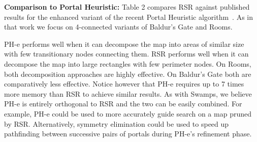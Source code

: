 \textbf{Comparison to Portal Heuristic:}
Table 2 compares RSR against published results for the enhanced variant of the
recent Portal Heuristic algorithm~\cite{goldenberg10}.  As in that work we focus
on 4-connected variants of Baldur's Gate and Rooms.
\par
PH-e performs well when it can decompose the map into areas of similar size with
few transitionary nodes connecting them.
RSR performs well when it can decompose the map into large rectangles with few
perimeter nodes.
On Rooms, both decomposition approaches are highly effective. 
On Baldur's Gate both are comparatively less effective.
Notice however that PH-e requires up to 7 times more memory than RSR to achieve
similar results.
As with Swamps, we believe PH-e is entirely orthogonal to RSR and the two can be 
easily combined. For example, PH-e could be used to more accurately guide search
on a map pruned by RSR. Alternatively, symmetry elimination could be used to 
speed up pathfinding between successive pairs of portals during PH-e's refinement phase.

